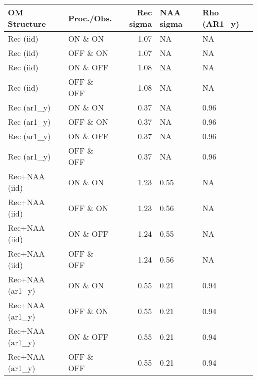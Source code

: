 \begin{table}[H]
    \centering
    \begin{tabular}{llrll}
        \toprule
        OM Structure & Proc./Obs. & Rec sigma & NAA sigma & Rho (AR1\_y) \\
        \midrule
        Rec (iid)       & ON \& ON   & 1.07 & NA & NA \\
        Rec (iid)       & OFF \& ON  & 1.07 & NA & NA \\
        Rec (iid)       & ON \& OFF  & 1.08 & NA & NA \\
        Rec (iid)       & OFF \& OFF & 1.08 & NA & NA \\
        Rec (ar1\_y)    & ON \& ON   & 0.37 & NA & 0.96 \\
        Rec (ar1\_y)    & OFF \& ON  & 0.37 & NA & 0.96 \\
        Rec (ar1\_y)    & ON \& OFF  & 0.37 & NA & 0.96 \\
        Rec (ar1\_y)    & OFF \& OFF & 0.37 & NA & 0.96 \\
        Rec+NAA (iid)      & ON \& ON   & 1.23 & 0.55 & NA \\
        Rec+NAA (iid)      & OFF \& ON  & 1.23 & 0.56 & NA \\
        Rec+NAA (iid)      & ON \& OFF  & 1.24 & 0.55 & NA \\
        Rec+NAA (iid)      & OFF \& OFF & 1.24 & 0.56 & NA \\
        Rec+NAA (ar1\_y)   & ON \& ON   & 0.55 & 0.21 & 0.94 \\
        Rec+NAA (ar1\_y)   & OFF \& ON  & 0.55 & 0.21 & 0.94 \\
        Rec+NAA (ar1\_y)   & ON \& OFF  & 0.55 & 0.21 & 0.94 \\
        Rec+NAA (ar1\_y)   & OFF \& OFF & 0.55 & 0.21 & 0.94 \\
        \bottomrule
    \end{tabular}
\end{table}
